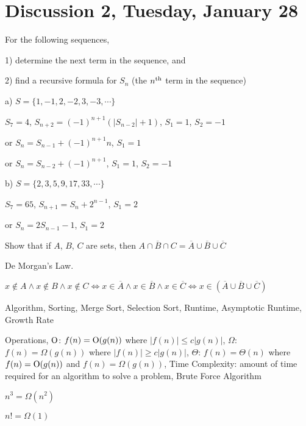 \section{Discussion 2, Tuesday, January 28}

\begin{prob}

For the following sequences,

1) determine the next term in the sequence, and

2) find a recursive formula for $S_n$ (the $n^{\rm th}$ term in the sequence)

a) $S = \{1, -1, 2, -2, 3, -3, \cdots\}$

$S_7 = 4$, $S_{n + 2} = (-1)^{n + 1} (|S_{n - 2}| + 1)$, $S_1 = 1$, $S_2 = -1$

or $S_n = S_{n - 1} + (-1)^{n + 1} n$, $S_1 = 1$

or $S_n = S_{n - 2} + (-1)^{n + 1}$, $S_1 = 1$, $S_2 = -1$

b) $S = \{2, 3, 5, 9, 17, 33, \cdots\}$

$S_7 = 65$, $S_{n + 1} = S_{n} + 2^{n - 1}$, $S_1 = 2$

or $S_n = 2S_{n - 1} - 1$, $S_1 = 2$
\end{prob}

\begin{prob}
Show that if $A$, $B$, $C$ are sets, then ${\overline {A \cap B \cap C}} = {\overline A} \cup {\overline B} \cup {\overline C}$

De Morgan's Law.

$x \notin A \land x \notin B \land x \notin C \Leftrightarrow x \in \overline A \land x \in \overline B \land x \in \overline C \Leftrightarrow x \in ({\overline A} \cup {\overline B} \cup {\overline C})$

\end{prob}

Algorithm, Sorting, Merge Sort, Selection Sort, Runtime, Asymptotic Runtime, Growth Rate

Operations, ${\rm O}$: $f(n) = {\rm O}(g(n))$ where $|f(n)| \leq c|g(n)|$, $\Omega$: $f(n) = \Omega(g(n))$ where $|f(n)| \geq c|g(n)|$, $\Theta$: $f(n) = \Theta(n)$ where $f(n) = {\rm O}(g(n))$ and $f(n) = \Omega(g(n))$, Time Complexity: amount of time required for an algorithm to solve a problem, Brute Force Algorithm

\begin{ex}
$n^3 = \Omega(n^2)$
\end{ex}

\begin{ex}
$n! = \Omega(1)$
\end{ex}


